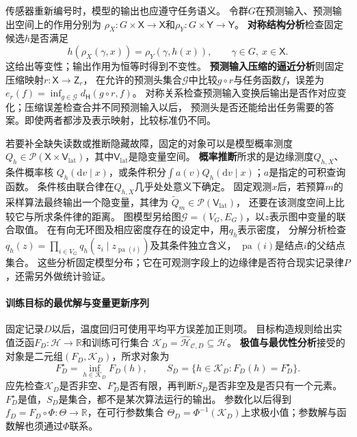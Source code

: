 传感器重新编号时，模型的输出也应遵守任务语义。
令群$G$在预测输入、预测输出空间上的作用分别为
$\rho_X:G\times\mathsf X\to\mathsf X$和$\rho_Y:G\times\mathsf Y\to\mathsf Y$。
\textbf{对称结构分析}检查固定候选$h$是否满足
\[
  h(\rho_X(\gamma,x))=\rho_Y(\gamma,h(x)),
  \qquad \gamma\in G,\ x\in\mathsf X.
\]
这给出等变性；输出作用为恒等时得到不变性。
\textbf{预测输入压缩的逼近分析}则固定压缩映射$r:\mathsf X\to\mathsf Z_r$，
在允许的预测头集合$\mathcal G$中比较$g\circ r$与任务函数$f$，误差为
$e_r(f)=\inf_{g\in\mathcal G}d_{\mathsf H}(g\circ r,f)$。
对称关系检查预测输入变换后输出是否作对应变化；压缩误差检查合并不同预测输入以后，
预测头是否还能给出任务需要的答案。即使两者都涉及表示映射，比较标准仍不同。

若要补全缺失读数或推断隐藏故障，固定的对象可以是模型概率测度
$Q_h\in\mathcal P(\mathsf X\times\mathsf V_{\mathrm{lat}})$，其中$\mathsf V_{\mathrm{lat}}$是隐变量空间。
\textbf{概率推断}所求的是边缘测度$Q_{h,X}$、条件概率核
$Q_h(\mathrm dv\mid x)$，或条件积分$\int a(v)Q_h(\mathrm dv\mid x)$；$a$是指定的可积查询函数。
条件核由联合律在$Q_{h,X}$几乎处处意义下确定。
固定观测$x$后，若预算$m$的采样算法最终输出一个隐变量，其律为
$\widetilde Q_m\in\mathcal P(\mathsf V_{\mathrm{lat}})$，
还要在该测度空间上比较它与所求条件律的距离。
图模型另给图$\mathcal G=(V_G,E_G)$，以$z$表示图中变量的联合取值。
在有向无环图及相应密度存在的设定中，用$q_h$表示密度，
分解分析检查$q_h(z)=\prod_{i\in V_G}q_h(z_i\mid z_{\operatorname{pa}(i)})$及其条件独立含义，
$\operatorname{pa}(i)$是结点$i$的父结点集合。
这些分析固定模型分布；它在可观测字段上的边缘律是否符合现实记录律$P$，还需另外做统计验证。

\paragraph{训练目标的最优解与变量更新序列}
\label{sec:future-ml-training-solving}

固定记录$D$以后，温度回归可使用平均平方误差加正则项。
目标构造规则给出实值泛函$F_D:\mathcal H\to\mathbb R$和训练可行集合
$\mathcal K_D=\widehat{\mathcal H}_{\mathcal C,D}\subseteq\mathcal H$。
\textbf{极值与最优性分析}接受的对象是二元组$(F_D,\mathcal K_D)$，所求对象为
\[
  F_D^\star=\inf_{h\in\mathcal K_D}F_D(h),\qquad
  S_D=\{h\in\mathcal K_D:F_D(h)=F_D^\star\}.
\]
应先检查$\mathcal K_D$是否非空、$F_D^\star$是否有限，再判断$S_D$是否非空及是否只有一个元素。
$F_D^\star$是值，$S_D$是集合，都不是某次算法运行的输出。
参数化以后得到$f_D=F_D\circ\Phi:\Theta\to\mathbb R$，在可行参数集合
$\Theta_D=\Phi^{-1}(\mathcal K_D)$上求极小值；参数解与函数解也须通过$\Phi$联系。

